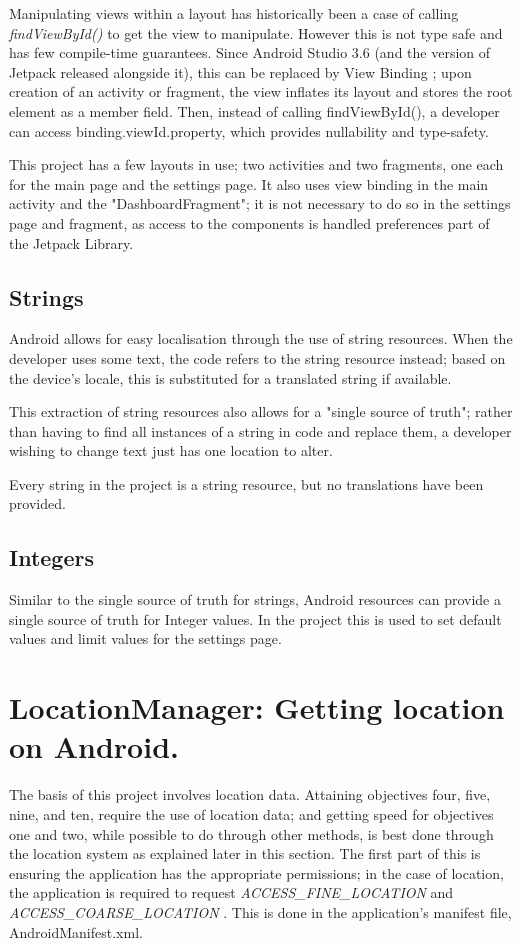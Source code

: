 \documentclass[11pt, a4paper, notitlepage]{report}
\begin{document}
Manipulating views within a layout has historically been a case of calling \textit{findViewById()} to get the view to manipulate. However this is not type safe and has few compile-time guarantees. Since Android Studio 3.6 (and the version of Jetpack released alongside it), this can be replaced by View Binding \citep{viewBindingAndroid}; upon creation of an activity or fragment, the view inflates its layout and stores the root element as a member field. Then, instead of calling findViewById(), a developer can access binding.viewId.property, which provides nullability and type-safety.

This project has a few layouts in use; two activities and two fragments, one each for the main page and the settings page. It also uses view binding in the main activity and the "DashboardFragment"; it is not necessary to do so in the settings page and fragment, as access to the components is handled preferences part of the Jetpack Library.

\subsection{Strings}
Android allows for easy localisation through the use of string resources. When the developer uses some text, the code refers to the string resource instead; based on the device's locale, this is substituted for a translated string if available.

This extraction of string resources also allows for a "single source of truth"; rather than having to find all instances of a string in code and replace them, a developer wishing to change text just has one location to alter.

Every string in the project is a string resource, but no translations have been provided.

\subsection{Integers}
Similar to the single source of truth for strings, Android resources can provide a single source of truth for Integer values. In the project this is used to set default values and limit values for the settings page.

\section{LocationManager: Getting location on Android.}
The basis of this project involves location data. Attaining objectives four, five, nine, and ten, require the use of location data; and getting speed for objectives one and two, while possible to do through other methods, is best done through the location system as explained later in this section. The first part of this is ensuring the application has the appropriate permissions; in the case of location, the application is required to request \textit{ACCESS\_FINE\_LOCATION} and \textit{ACCESS\_COARSE\_LOCATION} \citep{permissionsAndroid}. This is done in the application's manifest file, AndroidManifest.xml.
\end{document}
